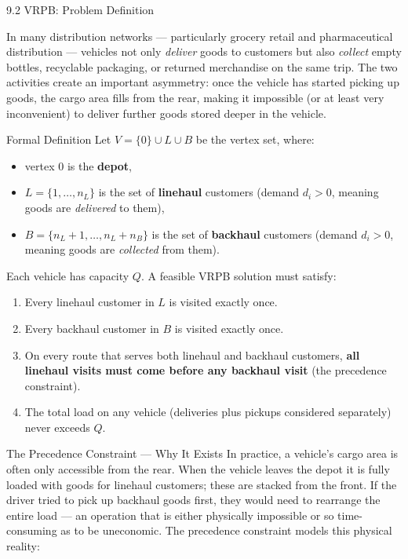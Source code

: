 \documentclass[aspectratio=169,10pt]{beamer}
\begin{document}
\begin{frame}[allowframebreaks]{9.2 VRPB: Problem Definition}

In many distribution networks --- particularly grocery retail and
pharmaceutical distribution --- vehicles not only \emph{deliver} goods to
customers but also \emph{collect} empty bottles, recyclable packaging, or
returned merchandise on the same trip.  The two activities create an
important asymmetry: once the vehicle has started picking up goods, the
cargo area fills from the rear, making it impossible (or at least very
inconvenient) to deliver further goods stored deeper in the vehicle.

\begin{block}{Formal Definition}
  Let $V = \{0\} \cup L \cup B$ be the vertex set, where:
  \begin{itemize}
    \item vertex $0$ is the \textbf{depot},
    \item $L = \{1, \ldots, n_L\}$ is the set of \textbf{linehaul} customers
          (demand $d_i > 0$, meaning goods are \emph{delivered} to them),
    \item $B = \{n_L+1, \ldots, n_L+n_B\}$ is the set of \textbf{backhaul}
          customers (demand $d_i > 0$, meaning goods are \emph{collected} from
          them).
  \end{itemize}
  Each vehicle has capacity $Q$.  A feasible VRPB solution must satisfy:
  \begin{enumerate}
    \item Every linehaul customer in $L$ is visited exactly once.
    \item Every backhaul customer in $B$ is visited exactly once.
    \item On every route that serves both linehaul and backhaul customers,
          \textbf{all linehaul visits must come before any backhaul visit}
          (the precedence constraint).
    \item The total load on any vehicle (deliveries plus pickups considered
          separately) never exceeds $Q$.
  \end{enumerate}
\end{block}

\framebreak

\begin{block}{The Precedence Constraint --- Why It Exists}
  In practice, a vehicle's cargo area is often only accessible from the rear.
  When the vehicle leaves the depot it is fully loaded with goods for linehaul
  customers; these are stacked from the front.  If the driver tried to pick up
  backhaul goods first, they would need to rearrange the entire load --- an
  operation that is either physically impossible or so time-consuming as to be
  uneconomic.  The precedence constraint models this physical reality:


\end{block}
\end{frame}
\end{document}
